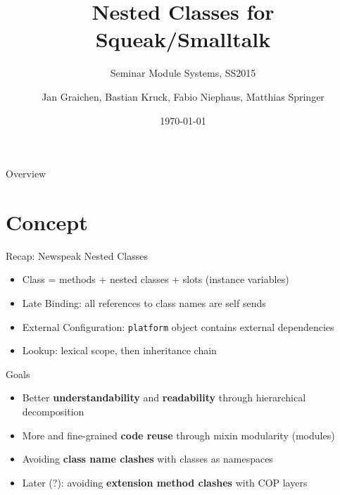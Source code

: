 \documentclass[xcolor=dvipsname, handout]{beamer} %
\title{Nested Classes for Squeak/Smalltalk}
\subtitle{Seminar Module Systems, SS2015}
\author{Jan Graichen, Bastian Kruck, Fabio Niephaus, Matthias Springer}
\date{\today}
\institute[2015]{Software Architecture Group, Hasso Plattner Institute}
\begin{document}
\begin{frame}[plain]
	\maketitle
\end{frame}
\begin{frame}{Overview}
	\tableofcontents[hideallsubsections]
\end{frame}


\section{Concept}
\begin{frame}{Recap: Newspeak Nested Classes}
  \begin{itemize}
    \item Class = methods + nested classes + slots (instance variables)
    \item Late Binding: all references to class names are self sends
    \item External Configuration: \texttt{platform} object contains external dependencies
    \item Lookup: lexical scope, then inheritance chain
  \end{itemize}
\end{frame}

\begin{frame}{Goals}
  \begin{itemize}
    \item Better \textbf{understandability} and \textbf{readability} through hierarchical decomposition
    \item More and fine-grained \textbf{code reuse} through mixin modularity (modules)
    \item Avoiding \textbf{class name clashes} with classes as namespaces
    \item Later (?): avoiding \textbf{extension method clashes} with COP layers
  \end{itemize}
\end{frame}
\end{document}
